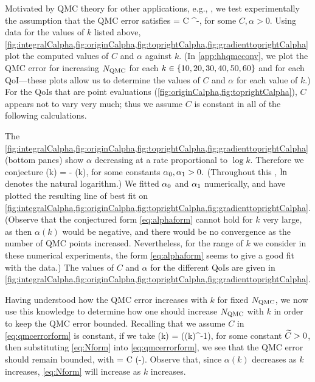 Motivated by QMC theory for other applications, e.g., \cite[Equation 4.2]{GrKuNuScSl:11}, we test experimentally the assumption that the QMC error satisfies
\beq\label{eq:qmcerrorform}
 = C \NQMC^{-\alpha},
\eeq
for some $C, \alpha > 0.$ Using data for the values of $k$ listed above, \cref{fig:integralCalpha,fig:originCalpha,fig:toprightCalpha,fig:gradienttoprightCalpha} plot the computed values of $C$ and $\alpha$ against $k$. (In \cref{app:hhqmcconv}, we plot the QMC error for increasing $N_{\mathrm{QMC}}$ for each $k \in \set{10,20,30,40,50,60}$ and for each QoI---these plots allow us to determine the values of $C$ and $\alpha$ for each value of $k.$) For the QoIs that are point evaluations (\cref{fig:originCalpha,fig:toprightCalpha}), $C$ appears not to vary very much; thus we assume $C$ is constant in all of the following calculations.

The \cref{fig:integralCalpha,fig:originCalpha,fig:toprightCalpha,fig:gradienttoprightCalpha} (bottom panes) show $\alpha$ decreasing at a rate proportional to $\log k$. Therefore we conjecture
\beq\label{eq:alphaform}
\alpha(k) = \alphaz - \alphao\loge(k),
\eeq
for some constants $\alpha_{0},\alpha_{1} > 0.$ (Throughout this , $\operatorname{ln}$ denotes the natural logarithm.) We fitted $\alpha_{0}$ and $\alpha_{1}$ numerically, and have plotted the resulting line of best fit on \cref{fig:integralCalpha,fig:originCalpha,fig:toprightCalpha,fig:gradienttoprightCalpha}. (Observe that the conjectured form \cref{eq:alphaform} cannot hold for $k$ very large, as then $\alpha(k)$ would be negative, and there would be no convergence as the number of QMC points increased. Nevertheless, for the range of $k$ we consider in these numerical experiments, the form \cref{eq:alphaform} seems to give a good fit with the data.) The values of $C$ and $\alpha$ for the different QoIs are given in \cref{fig:integralCalpha,fig:originCalpha,fig:toprightCalpha,fig:gradienttoprightCalpha}.

Having understood how the QMC error increases with $k$ for fixed $N_{\mathrm{QMC}}$, we now use this knowledge to determine how one should increase $N_{\mathrm{QMC}}$ with $k$ in order to keep the QMC error bounded. Recalling that we assume $C$ in \cref{eq:qmcerrorform} is constant, if we take
\beq\label{eq:Nform}
\NQMC(k) = \exp\mleft(\Ctilde \alpha(k)^{-1}\mright),
\eeq
for some constant $\widetilde{C} > 0$, then substituting \cref{eq:Nform} into \cref{eq:qmcerrorform}, we see that the QMC error should remain bounded, with
\beqs
{} = C \exp\mleft(-\Ctilde\mright).
\eeqs
Observe that, since $\alpha(k)$ decreases as $k$ increases, \cref{eq:Nform} will increase as $k$ increases.

